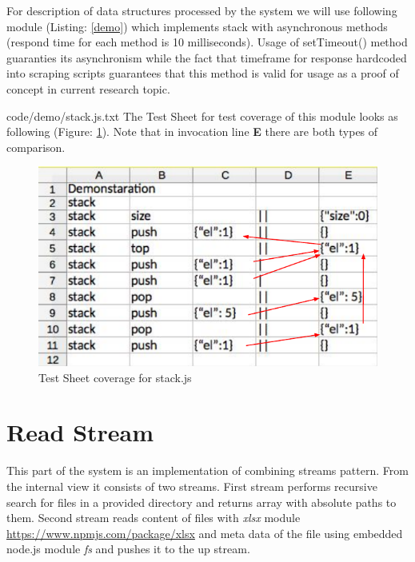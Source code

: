 For description of data structures processed by the system we will use following module (Listing: \ref{demo}) which implements stack with asynchronous methods (respond time for each method is 10 milliseconds). Usage of setTimeout() method guaranties its asynchronism while the fact that timeframe for response hardcoded into scraping scripts guarantees that this method is valid for usage as a proof of concept in current research topic.

{code/demo/stack.js.txt}
The Test Sheet for test coverage of this module looks as following (Figure: \ref{fig:demoTS}). Note that in invocation line \textbf{E} there are both types of comparison.
\begin{figure}[H]
\centering
\includegraphics[width=\linewidth]{grafiken/demoTS}
\caption{Test Sheet coverage for stack.js}
\label{fig:demoTS}
\end{figure}



\section{Read Stream}

This part of the system is an implementation of combining streams pattern. From the internal view it consists of two streams. First stream performs recursive search for files in a provided directory and returns array with absolute paths to them. Second stream reads content of files with \textit{xlsx} module \url{https://www.npmjs.com/package/xlsx} and meta data of the file using embedded node.js module \textit{fs} and pushes it to the up stream.

